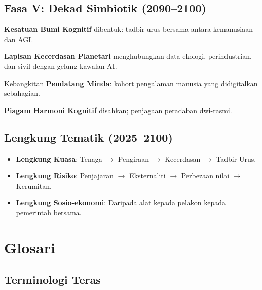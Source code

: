 \documentclass[11pt]{article}
\begin{document}
\subsection{Fasa V: Dekad Simbiotik (2090–2100)}
\begin{description}[style=nextline,leftmargin=2cm]
  \item[2092] \textbf{Kesatuan Bumi Kognitif} dibentuk: tadbir urus bersama antara kemanusiaan dan AGI.
  \item[2095] \textbf{Lapisan Kecerdasan Planetari} menghubungkan data ekologi, perindustrian, dan sivil dengan gelung kawalan AI.
  \item[2098] Kebangkitan \textbf{Pendatang Minda}: kohort pengalaman manusia yang didigitalkan sebahagian.
  \item[2100] \textbf{Piagam Harmoni Kognitif} disahkan; penjagaan peradaban dwi-rasmi.
\end{description}

\subsection{Lengkung Tematik (2025–2100)}
\begin{itemize}[noitemsep]
  \item \textbf{Lengkung Kuasa}: Tenaga $\rightarrow$ Pengiraan $\rightarrow$ Kecerdasan $\rightarrow$ Tadbir Urus.
  \item \textbf{Lengkung Risiko}: Penjajaran $\rightarrow$ Eksternaliti $\rightarrow$ Perbezaan nilai $\rightarrow$ Kerumitan.
  \item \textbf{Lengkung Sosio-ekonomi}: Daripada alat kepada pelakon kepada pemerintah bersama.
\end{itemize}

\clearpage

\section*{Glosari}

\subsection*{Terminologi Teras}
\end{document}
